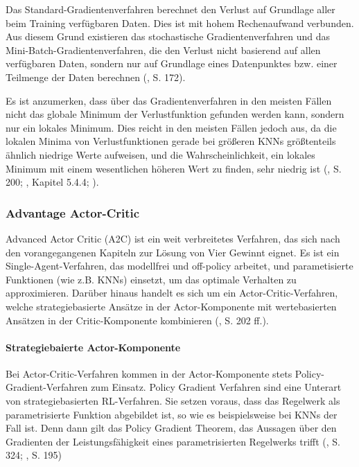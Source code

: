 Das Standard-Gradientenverfahren berechnet den Verlust auf Grundlage aller beim Training verfügbaren Daten. Dies ist mit hohem Rechenaufwand verbunden. Aus diesem Grund existieren das stochastische Gradientenverfahren und das Mini-Batch-Gradientenverfahren, die den Verlust nicht basierend auf allen verfügbaren Daten, sondern nur auf Grundlage eines Datenpunktes bzw. einer Teilmenge der Daten berechnen (\cite{Albrecht.2024}, S. 172).

Es ist anzumerken, dass über das Gradientenverfahren in den meisten Fällen nicht das globale Minimum der Verlustfunktion gefunden werden kann, sondern nur ein lokales Minimum. Dies reicht in den meisten Fällen jedoch aus, da die lokalen Minima von Verlustfunktionen gerade bei größeren KNNs größtenteils ähnlich niedrige Werte aufweisen, und die Wahrscheinlichkeit, ein lokales Minimum mit einem wesentlichen höheren Wert zu finden, sehr niedrig ist (\cite{Sutton.2018}, S. 200; \cite{Ferguson.January2019}, Kapitel 5.4.4; \cite{Choromanska.2015}).

\subsubsection{Advantage Actor-Critic}

Advanced Actor Critic (A2C) ist ein weit verbreitetes Verfahren, das sich nach den vorangegangenen Kapiteln zur Lösung von Vier Gewinnt eignet. Es ist ein Single-Agent-Verfahren, das modellfrei und off-policy arbeitet, und parametisierte Funktionen (wie z.B. KNNs) einsetzt, um das optimale Verhalten zu approximieren. Darüber hinaus handelt es sich um ein Actor-Critic-Verfahren, welche strategiebasierte Ansätze in der Actor-Komponente mit wertebasierten Ansätzen in der Critic-Komponente kombinieren (\cite{Albrecht.2024}, S. 202 ff.).

\paragraph{Strategiebaierte Actor-Komponente}

Bei Actor-Critic-Verfahren kommen in der Actor-Komponente stets Policy-Gradient-Verfahren zum Einsatz. Policy Gradient Verfahren sind eine Unterart von strategiebasierten RL-Verfahren. Sie setzen voraus, dass das Regelwerk als parametrisierte Funktion abgebildet ist, so wie es beispielsweise bei KNNs der Fall ist. Denn dann gilt das Policy Gradient Theorem, das Aussagen über den Gradienten der Leistungsfähigkeit eines parametrisierten Regelwerks trifft (\cite{Sutton.2018}, S. 324; \cite{Albrecht.2024}, S. 195)

